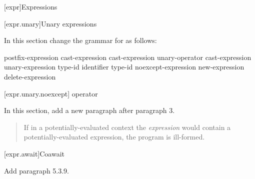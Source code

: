 

\setcounter{chapter}{4}
[expr]{Expressions}

\setcounter{section}{2}
[expr.unary]{Unary expressions}


In this section change the grammar for  as follows:

\begin{bnf}
	\br
	postfix-expression\br
	\terminal{++} cast-expression\br
	\terminal{-{-}} cast-expression\br
	\br
	unary-operator cast-expression\br
	 unary-expression\br
	 type-id \terminal{)}\br
	 \terminal{(} identifier \terminal{)}\br
	 type-id \terminal{)}\br
	noexcept-expression\br
	new-expression\br
	delete-expression\br
\end{bnf}

\setcounter{subsection}{6}
[expr.unary.noexcept]{ operator}


In this section, add a new paragraph after paragraph 3.

\begin{quote}
\setcounter{Paras}{3}
\pnum
If in a potentially-evaluated context the \textit{expression} would contain a potentially-evaluated  expression, the program is ill-formed.
\end{quote}


\setcounter{subsection}{8}
[expr.await]{Coawait}

Add paragraph 5.3.9.

